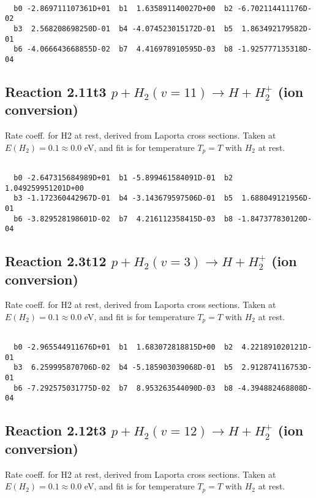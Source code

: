 \begin{small}\begin{verbatim}

  b0 -2.869711107361D+01  b1  1.635891140027D+00  b2 -6.702114411176D-02
  b3  2.568208698250D-01  b4 -4.074523015172D-01  b5  1.863492179582D-01
  b6 -4.066643668855D-02  b7  4.416978910595D-03  b8 -1.925777135318D-04

\end{verbatim}\end{small}

\newpage
\subsection{
Reaction 2.11t3
$ p + H_2(v=11) \rightarrow H + H_2^+$ (ion conversion)
}
Rate coeff. for H2 at rest, derived from Laporta cross sections.
Taken at $E(H_2) = 0.1 \approx 0.0$ eV,  and fit is for temperature $T_p=T$ with $H_2$ at rest.

\begin{small}\begin{verbatim}

  b0 -2.647315684989D+01  b1 -5.899461584091D-01  b2  1.049259951201D+00
  b3 -1.172360442967D-01  b4 -3.143679597506D-01  b5  1.688049121956D-01
  b6 -3.829528198601D-02  b7  4.216112358415D-03  b8 -1.847377830120D-04

\end{verbatim}\end{small}

\newpage
\subsection{
Reaction 2.3t12
$ p + H_2(v=3) \rightarrow H + H_2^+$ (ion conversion)
}
Rate coeff. for H2 at rest, derived from Laporta cross sections.
Taken at $E(H_2) = 0.1 \approx 0.0$ eV,  and fit is for temperature $T_p=T$ with $H_2$ at rest.

\begin{small}\begin{verbatim}

  b0 -2.965544911676D+01  b1  1.683072818815D+00  b2  4.221891020121D-01
  b3  6.259995870706D-02  b4 -5.185903039068D-01  b5  2.912874116753D-01
  b6 -7.292575031775D-02  b7  8.953263544090D-03  b8 -4.394882468808D-04

\end{verbatim}\end{small}

\newpage
\subsection{
Reaction 2.12t3
$ p + H_2(v=12) \rightarrow H + H_2^+$ (ion conversion)
}
Rate coeff. for H2 at rest, derived from Laporta cross sections.
Taken at $E(H_2) = 0.1 \approx 0.0$ eV,  and fit is for temperature $T_p=T$ with $H_2$ at rest.

